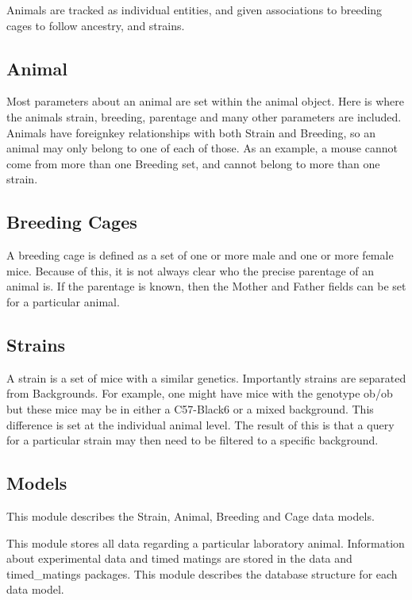 \documentclass[letterpaper,10pt,english]{sphinxmanual}
\begin{document}
Animals are tracked as individual entities, and given associations to breeding cages to follow ancestry, and strains.


\subsection{Animal}

Most parameters about an animal are set within the animal object.  Here is where the animals strain, breeding, parentage and many other parameters are included.  Animals have foreignkey relationships with both Strain and Breeding, so an animal may only belong to one of each of those.  As an example, a mouse cannot come from more than one Breeding set, and cannot belong to more than one strain.


\subsection{Breeding Cages}

A breeding cage is defined as a set of one or more male and one or more female mice.  Because of this, it is not always clear who the precise parentage of an animal is.  If the parentage is known, then the Mother and Father fields can be set for a particular animal.


\subsection{Strains}

A strain is a set of mice with a similar genetics.  Importantly strains are separated from Backgrounds.  For example, one might have mice with the genotype ob/ob but these mice may be in either a C57-Black6 or a mixed background.  This difference is set at the individual animal level.  
The result of this is that a query for a particular strain may then need to be filtered to a specific background.


\subsection{Models}
\hypertarget{module-animal.models}{}
\modulesynopsis{}
This module describes the Strain, Animal, Breeding and Cage data models.

This module stores all data regarding a particular laboratory animal.  Information about experimental data and timed matings are stored in the data and timed\_matings packages.  This module describes the database structure for each data model.
\end{document}
